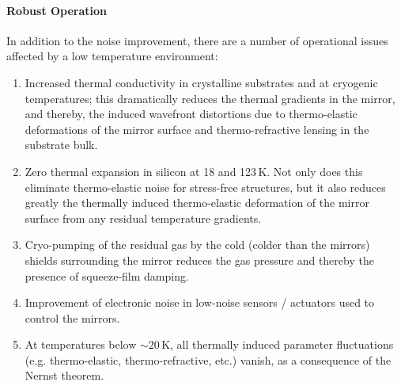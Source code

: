 \paragraph{Robust Operation}
In addition to the noise improvement, there are a number of operational issues affected by a low temperature environment:
\begin{enumerate}
\item Increased thermal conductivity in crystalline substrates and at cryogenic temperatures; this dramatically reduces the thermal gradients in the mirror, and thereby, the induced wavefront distortions due to thermo-elastic deformations of the mirror surface and thermo-refractive lensing in the substrate bulk.
\item Zero thermal expansion in silicon at 18 and 123\,K. Not only does this eliminate thermo-elastic noise for stress-free structures, but it also reduces greatly the thermally induced thermo-elastic deformation of the mirror surface from any residual temperature gradients.
\item Cryo-pumping of the residual gas by the cold (colder than the mirrors) shields surrounding the mirror reduces the gas pressure and thereby the presence of squeeze-film damping.
\item Improvement of electronic noise in low-noise sensors / actuators used to control the mirrors.
\item At temperatures below $\sim$20\,K, all thermally induced parameter fluctuations (e.g. thermo-elastic, thermo-refractive, etc.) vanish, as a consequence of the Nernst theorem.
\end{enumerate}



